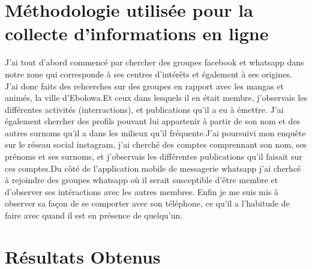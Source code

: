 \documentclass[french]{article}
\begin{document}
\section{Méthodologie utilisée pour la collecte d'informations en ligne}

J'ai tout d'abord commencé par chercher des groupes facebook et whatsapp dans notre zone qui corresponde à ses centres d'intérêts et également à ses origines. \newline J'ai donc faits des rehcerches sur des groupes en rapport avec les mangas et animés, la ville d'Ebolowa.\newline Et ceux dans lesquels il en était membre, j'observais les différentes activités (interractions), et publications qu'il a eu à émettre. \newline J'ai également chercher des profils pouvant lui appartenir à partir de son nom et des autres surnoms qu'il a dans les milieux qu'il fréquente.\newline J'ai poursuivi mon enquête sur le réseau social instagram, j'ai cherché des comptes comprennant son nom, ses prénoms et ses surnoms, et j'observais les différentes publications qu'il faisait sur ces comptes.\newline Du côté de l'application mobile de messagerie whatsapp j'ai cherhcé à rejoindre des groupes whatsapp où il serait susceptible d'être membre et d'observer ses intéractions avec les autres membres. \newline Enfin je me suis mis à observer sa façon de se comporter avec son téléphone, ce qu'il a l'habitude de faire avec quand il est en présence de quelqu'un.




\section{Résultats Obtenus}
\end{document}
